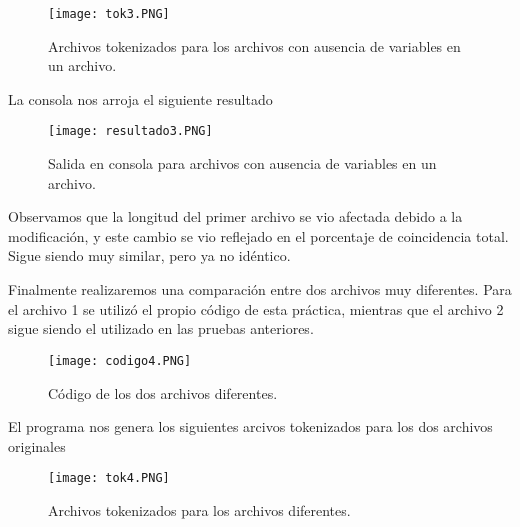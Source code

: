 \documentclass[12pt,twoside]{article}
\begin{document}
\vspace{0cm}

\begin{figure}[htb]
\centering
\texttt{[image: tok3.PNG]}
\caption{Archivos tokenizados para los archivos con ausencia de variables en un archivo.}
\end{figure}

\vspace{0cm}

La consola nos arroja el siguiente resultado

\vspace{0cm}

\begin{figure}[htb]
\centering
\texttt{[image: resultado3.PNG]}
\caption{Salida en consola para archivos con ausencia de variables en un archivo.}
\end{figure}

\vspace{0cm}

Observamos que la longitud del primer archivo se vio afectada debido a la modificaci\'on, y este cambio se vio reflejado en el porcentaje de coincidencia total. Sigue siendo muy similar, pero ya no id\'entico. 

\newpage

Finalmente realizaremos una comparaci\'on entre dos archivos muy diferentes. Para el archivo 1 se utiliz\'o el propio c\'odigo de esta pr\'actica, mientras que el archivo 2 sigue siendo el utilizado en las pruebas anteriores.

\vspace{0cm}

\begin{figure}[htb]
\centering
\texttt{[image: codigo4.PNG]}
\caption{C\'odigo de los dos archivos diferentes.}
\end{figure}

\vspace{0cm}

\vspace{5mm} %

El programa nos genera los siguientes arcivos tokenizados para los dos archivos originales

\vspace{5mm} %

\vspace{0cm}

\begin{figure}[htb]
\centering
\texttt{[image: tok4.PNG]}
\caption{Archivos tokenizados para los archivos diferentes.}
\end{figure}
\end{document}
